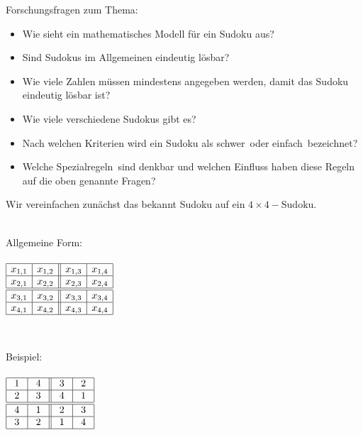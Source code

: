 Forschungsfragen zum Thema:
\begin{itemize}
\item Wie sieht ein mathematisches Modell für ein Sudoku aus?
\item Sind Sudokus im Allgemeinen eindeutig lösbar?
\item Wie viele Zahlen müssen mindestens angegeben werden, damit das Sudoku eindeutig lösbar ist?
\item Wie viele verschiedene Sudokus gibt es?
\item Nach welchen Kriterien wird ein Sudoku als \glqq schwer\grqq\ oder \glqq einfach\grqq\ bezeichnet?
\item Welche \glqq Spezialregeln\grqq\ sind denkbar und welchen Einfluss haben diese Regeln auf die oben genannte Fragen?
\end{itemize}
Wir vereinfachen zunächst das bekannt Sudoku auf ein $4\times 4 - \text{Sudoku}$.\\
\ \\
\begin{minipage}{0.4\textwidth}
\begin{center}
Allgemeine Form:\\ \ \\
\huge
$
\begin{array}{|c|c||c|c|}
\hline
x_{1,1} &  x_{1,2} & x_{1,3} & x_{1,4}\\
\hline
x_{2,1} &  x_{2,2} & x_{2,3} & x_{2,4}\\
\hline
\hline
x_{3,1} &  x_{3,2} & x_{3,3} & x_{3,4}\\
\hline
x_{4,1} &  x_{4,2} & x_{4,3} & x_{4,4}\\
\hline
\end{array}
$
\end{center}
\end{minipage}
\begin{minipage}{0.15\textwidth}
~
\end{minipage}
\begin{minipage}{0.4\textwidth}
\begin{center}
Beispiel:\\ \ \\
\huge
$
\begin{array}{|c|c||c|c|}
\hline
~1~ & ~4~ & ~3~ & ~2~\\
\hline
~2~ & ~3~ & ~4~ & ~1~\\
\hline
\hline
~4~ & ~1~ & ~2~ & ~3~\\
\hline
~3~ & ~2~ & ~1~ & ~4~\\
\hline
\end{array}
$
\end{center}
\end{minipage}
